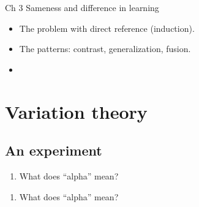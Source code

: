 \begin{frame}
  \begin{block}{Ch 3 Sameness and difference in learning}
    \begin{itemize}
      \item The problem with direct reference (induction).
      \item The patterns: contrast, generalization, fusion.
      \item {}
    \end{itemize}
  \end{block}
\end{frame}

\section{Variation theory}

\subsection{An experiment}

\begin{frame}\label<2>{vtind}
  

  \pause

  \begin{exercise}
    \begin{enumerate}
      \item What does \enquote{alpha} mean?
    \end{enumerate}
  \end{exercise}
\end{frame}

\begin{frame}\label{vtcon}
  
\end{frame}

\begin{frame}\label{vtgen}
  
\end{frame}

\begin{frame}
  \begin{question}[Again]
    \begin{enumerate}
      \item What does \enquote{alpha} mean?
    \end{enumerate}
  \end{question}
\end{frame}


